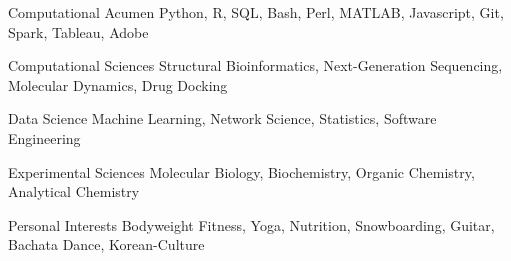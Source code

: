 \vspace{2mm}

\begin{cvskills}

  \cvskill
    {Computational Acumen} %
    {Python, R, SQL, Bash, Perl, MATLAB, Javascript, Git, Spark, Tableau, Adobe} %
    
  \cvskill
    {Computational Sciences} %
    {Structural Bioinformatics, Next-Generation Sequencing, Molecular Dynamics, Drug Docking} %
     
  \cvskill
    {Data Science} %
    {Machine Learning, Network Science, Statistics, Software Engineering} %
    
  \cvskill
    {Experimental Sciences} %
    {Molecular Biology, Biochemistry, Organic Chemistry, Analytical Chemistry} %

  \cvskill
    {Personal Interests} %
    {Bodyweight Fitness, Yoga, Nutrition, Snowboarding, Guitar, Bachata Dance, Korean-Culture} %
    
\vspace{-8.0mm}
\end{cvskills}